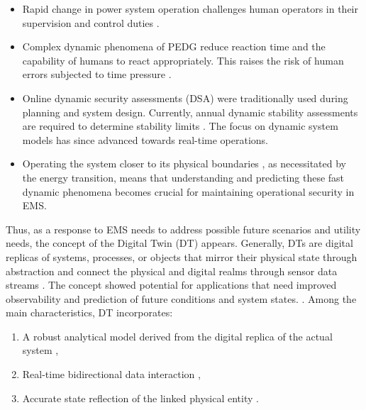 
\begin{itemize}
    \item Rapid change in power system operation challenges human operators in their supervision and control duties \autocite{cigre_700}.
    
    \item Complex dynamic phenomena of PEDG reduce reaction time and the capability of humans to react appropriately. This raises the risk of human errors subjected to time pressure \autocite{HAASS20155285}.
    
    \item Online dynamic security assessments (DSA) were traditionally used during planning and system design. Currently, annual dynamic stability assessments are required to determine stability limits \autocite{european_union_2017_1485}. The focus on dynamic system models has since advanced towards real-time operations.

    \item  Operating the system closer to its physical boundaries \autocite{8295027}, as necessitated by the energy transition, means that understanding and predicting these fast dynamic phenomena becomes crucial for maintaining operational security in EMS.
    
\end{itemize}


Thus, as a response to EMS needs to address possible future scenarios and utility needs, the concept of the Digital Twin (DT) appears. Generally, DTs are digital replicas of systems, processes, or objects that mirror their physical state through abstraction and connect the physical and digital realms through sensor data streams \autocite{lyu_2024_handbook}. The concept showed potential for applications that need improved observability and prediction of future conditions and system states. \autocite{eyre_untangling_2020}. Among the main characteristics, DT incorporates:
\begin{enumerate}
    \item A robust analytical model derived from the digital replica of the actual system \autocite{Trauer_2020},
    \item Real-time bidirectional data interaction \autocite{VANDERHORN2021113524},
    \item Accurate state reflection of the linked physical entity \autocite{JONES202036}.
\end{enumerate}

